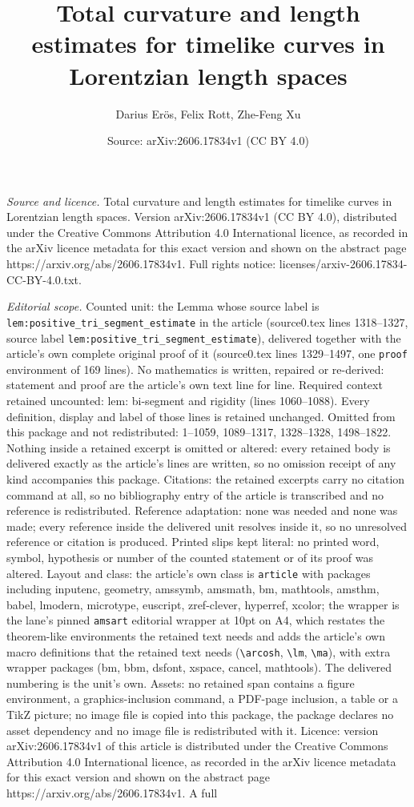 \documentclass[10pt,a4paper]{amsart}
\title[Total curvature and length estimates for timelike curves in ]{Total curvature and length estimates for timelike curves in Lorentzian length spaces}
\author{Darius Er\"os, Felix Rott, Zhe-Feng Xu}
\date{Source: arXiv:2606.17834v1 (CC BY 4.0)}
\begin{document}
\maketitle

\noindent\emph{Source and licence.} Total curvature and length estimates for timelike curves in Lorentzian length spaces. Version arXiv:2606.17834v1 (CC BY 4.0), distributed under the Creative Commons Attribution 4.0 International licence, as recorded in the arXiv licence metadata for this exact version and shown on the abstract page https://arxiv.org/abs/2606.17834v1. Full rights notice: licenses/arxiv-2606.17834-CC-BY-4.0.txt.\par\smallskip

\noindent\textit{Editorial scope.} Counted unit: the Lemma whose source label is \texttt{lem:positive\_tri\_segment\_estimate} in the article (source0.tex lines 1318--1327, source label \texttt{lem:positive\_tri\_segment\_estimate}), delivered together with the article's own complete original proof of it (source0.tex lines 1329--1497, one \texttt{proof} environment of 169 lines). No mathematics is written, repaired or re-derived: statement and proof are the article's own text line for line. Required context retained uncounted: lem: bi-segment and rigidity (lines 1060--1088). Every definition, display and label of those lines is retained unchanged. Omitted from this package and not redistributed: 1--1059, 1089--1317, 1328--1328, 1498--1822. Nothing inside a retained excerpt is omitted or altered: every retained body is delivered exactly as the article's lines are written, so no omission receipt of any kind accompanies this package. Citations: the retained excerpts carry no citation command at all, so no bibliography entry of the article is transcribed and no reference is redistributed. Reference adaptation: none was needed and none was made; every reference inside the delivered unit resolves inside it, so no unresolved reference or citation is produced. Printed slips kept literal: no printed word, symbol, hypothesis or number of the counted statement or of its proof was altered. Layout and class: the article's own class is \texttt{article} with packages including inputenc, geometry, amssymb, amsmath, bm, mathtools, amsthm, babel, lmodern, microtype, euscript, zref-clever, hyperref, xcolor; the wrapper is the lane's pinned \texttt{amsart} editorial wrapper at 10pt on A4, which restates the theorem-like environments the retained text needs and adds the article's own macro definitions that the retained text needs (\texttt{\textbackslash arcosh}, \texttt{\textbackslash lm}, \texttt{\textbackslash ma}), with extra wrapper packages (bm, bbm, dsfont, xspace, cancel, mathtools). The delivered numbering is the unit's own. Assets: no retained span contains a figure environment, a graphics-inclusion command, a PDF-page inclusion, a table or a TikZ picture; no image file is copied into this package, the package declares no asset dependency and no image file is redistributed with it. Licence: version arXiv:2606.17834v1 of this article is distributed under the Creative Commons Attribution 4.0 International licence, as recorded in the arXiv licence metadata for this exact version and shown on the abstract page https://arxiv.org/abs/2606.17834v1. A full 
\end{document}

